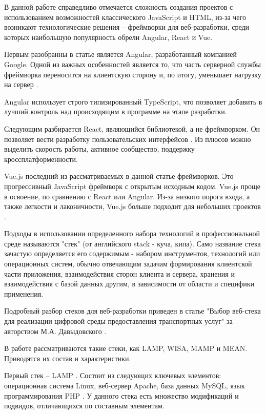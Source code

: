 В данной работе справедливо отмечается сложность создания проектов с использованием возможностей классического JavaScript и HTML, из-за чего возникают технологические решения -- фреймворки для веб-разработки, среди которых наибольшую популярность обрели Angular, React и Vue.

Первым разобранны в статье является Angular, разработанный компанией Google.
Одной из важных особенностей является то, что часть серверной службы фреймворка переносится на клиентскую сторону и, по итогу, уменьшает нагрузку на сервер \cite{sergacheva-framework-1}.

Angular использует строго типизированный TypeScript, что позволяет добавить в лучший контроль над происходящим в программе на этапе разработки.

Следующим разбирается React, являющийся библиотекой, а не фреймворком.
Он позволяет вести разработку пользовательских интерфейсов \cite{sergacheva-framework-2}.
Из плюсов можно выделить скорость работы, активное сообщество, поддержку кроссплатформенности.

Vue.js последний из рассматриваемых в данной статье фреймворков.
Это прогрессивный JavaScript фреймворк с открытым исходным кодом.
Vue.js проще в освоение, по сравнению с React или Angular.
Из-за низкого порога входа, а также легкости и лаконичности, Vue.js больше подходит для небольших проектов \cite{sergacheva-framework-4}.

Подходы в использовании определенного набора технологий в профессиональной среде называются "стек" (от английского stack - куча, кипа).
Само название стека зачастую определяется его содержимым - набором инструментов, технологий или операционных систем, обычно отвечающим  задачам формирования клиентской части приложения, взаимодействия сторон клиента и сервера, хранения и взаимодействия с базой данных другим, в зависимости от области и специфики применения.

Подробный разбор стеков для веб-разработки приведен в статье "Выбор веб-стека для реализации цифровой среды предоставления транспортных услуг" за авторством М.А. Давыдовского \cite{davidovsky-vibor}.

В работе рассматриваются такие стеки, как LAMP, WISA, MAMP и MEAN.
Приводятся их состав и характеристики.

Первый стек -- LAMP \cite{davidovsky-vibor-1}.
Состоит из следующих ключевых элементов: операционная система Linux, веб-сервер Apache, база данных MySQL, язык программирования PHP \cite{davidovsky-vibor-php}.
У данного стека есть множество модификаций и подвидов, отличающихся по составным элементам.

